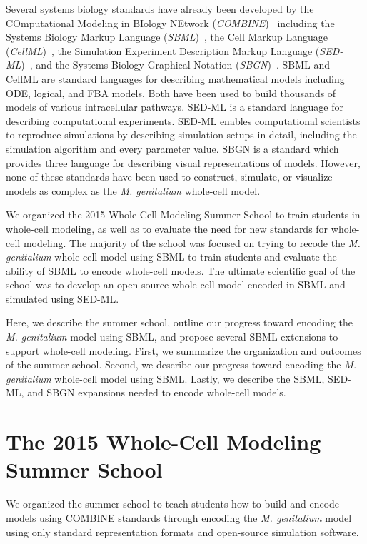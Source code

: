 \documentclass[journal,transmag]{IEEEtran}
\begin{document}
Several systems biology standards have already been developed by the COmputational Modeling in BIology NEtwork (\emph{COMBINE})~\cite{le2011meeting} including the Systems Biology Markup Language (\emph{SBML})~\cite{hucka2003}, the Cell Markup Language (\emph{CellML})~\cite{hedley_2001b}, the Simulation Experiment Description Markup Language (\emph{SED-ML})~\cite{sedml2011}, and the Systems Biology Graphical Notation (\emph{SBGN})~\cite{LeNovereHMMSS09}. SBML and CellML are standard languages for describing mathematical models including ODE, logical, and FBA models. Both have been used to build thousands of models of various intracellular pathways. SED-ML is a standard language for describing computational experiments. SED-ML enables computational scientists to reproduce simulations by describing simulation setups in detail, including the simulation algorithm and every parameter value. SBGN is a standard which provides three language for describing visual representations of models. However, none of these standards have been used to construct, simulate, or visualize models as complex as the \textit{M. genitalium} whole-cell model.

We organized the 2015 Whole-Cell Modeling Summer School to train students in whole-cell modeling, as well as to evaluate the need for new standards for whole-cell modeling. The majority of the school was focused on trying to recode the \textit{M. genitalium} whole-cell model using SBML to train students and evaluate the ability of SBML to encode whole-cell models. The ultimate scientific goal of the school was to develop an open-source whole-cell model encoded in SBML and simulated using SED-ML.

Here, we describe the summer school, outline our progress toward encoding the \textit{M. genitalium} model using SBML, and propose several SBML extensions to support whole-cell modeling. First, we summarize the organization and outcomes of the summer school. Second, we describe our progress toward encoding the \textit{M. genitalium} whole-cell model using SBML. Lastly, we describe the SBML, SED-ML, and SBGN expansions needed to encode whole-cell models.

\section{The 2015 Whole-Cell Modeling Summer School}
We organized the summer school to teach students how to build and encode models using COMBINE standards through encoding the \textit{M. genitalium} model using only standard representation formats and open-source simulation software.
\end{document}
